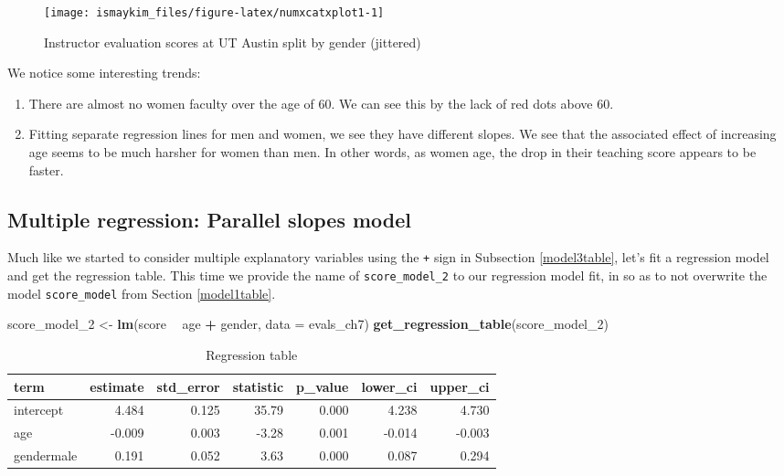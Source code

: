 \documentclass[12pt, krantz2,]{krantz}
\makeatletter
\newenvironment{Shaded}{\begin{snugshade}}{\end{snugshade}}
\newcommand{\DataTypeTok}[1]{\textcolor[rgb]{0.27,0.27,0.27}{#1}}
\newcommand{\DecValTok}[1]{\textcolor[rgb]{0.06,0.06,0.06}{#1}}
\newcommand{\KeywordTok}[1]{\textcolor[rgb]{0.27,0.27,0.27}{\textbf{#1}}}
\newcommand{\NormalTok}[1]{#1}
\newcommand{\OperatorTok}[1]{\textcolor[rgb]{0.43,0.43,0.43}{\textbf{#1}}}
\newcommand{\StringTok}[1]{\textcolor[rgb]{0.5,0.5,0.5}{#1}}
\providecommand{\tightlist}{%
  \setlength{\itemsep}{0pt}\setlength{\parskip}{0pt}}
\newenvironment{kframe}{%
\medskip{}
\setlength{\fboxsep}{.8em}
 \def\at@end@of@kframe{}%
 \ifinner\ifhmode%
  \def\at@end@of@kframe{\end{minipage}}%
  \begin{minipage}{\columnwidth}%
 \fi\fi%
 \def\FrameCommand##1{\hskip\@totalleftmargin \hskip-\fboxsep
 \colorbox{shadecolor}{##1}\hskip-\fboxsep
     \hskip-\linewidth \hskip-\@totalleftmargin \hskip\columnwidth}%
 \MakeFramed {\advance\hsize-\width
   \@totalleftmargin\z@ \linewidth\hsize
   \@setminipage}}%
 {\par\unskip\endMakeFramed%
 \at@end@of@kframe}
\renewenvironment{Shaded}{\begin{kframe}}{\end{kframe}}
\makeatother
\begin{document}
\begin{figure}

{\centering \texttt{[image: ismaykim\_files/figure-latex/numxcatxplot1-1]} 

}

\caption{Instructor evaluation scores at UT Austin split by gender (jittered)}\label{fig:numxcatxplot1}
\end{figure}

We notice some interesting trends:

\begin{enumerate}
\def\labelenumi{\arabic{enumi}.}
\tightlist
\item
  There are almost no women faculty over the age of 60. We can see this by the lack of red dots above 60.
\item
  Fitting separate regression lines for men and women, we see they have different slopes. We see that the associated effect of increasing age seems to be much harsher for women than men. In other words, as women age, the drop in their teaching score appears to be faster.
\end{enumerate}

\hypertarget{model4table}{%
\subsection{Multiple regression: Parallel slopes model}\label{model4table}}

Much like we started to consider multiple explanatory variables using the \texttt{+} sign in Subsection \ref{model3table}, let's fit a regression model and get the regression table. This time we provide the name of \texttt{score\_model\_2} to our regression model fit, in so as to not overwrite the model \texttt{score\_model} from Section \ref{model1table}.

\begin{Shaded}
\begin{Highlighting}[]
\NormalTok{score_model_}\DecValTok{2}\NormalTok{ <-}\StringTok{ }\KeywordTok{lm}\NormalTok{(score }\OperatorTok{~}\StringTok{ }\NormalTok{age }\OperatorTok{+}\StringTok{ }\NormalTok{gender, }\DataTypeTok{data =}\NormalTok{ evals_ch7)}
\KeywordTok{get_regression_table}\NormalTok{(score_model_}\DecValTok{2}\NormalTok{)}
\end{Highlighting}
\end{Shaded}

\begin{table}[H]

\caption{\label{tab:unnamed-chunk-220}Regression table}
\centering
\fontsize{10}{12}\selectfont
\begin{tabular}{lrrrrrr}
\toprule
term & estimate & std\_error & statistic & p\_value & lower\_ci & upper\_ci\\
\midrule
intercept & 4.484 & 0.125 & 35.79 & 0.000 & 4.238 & 4.730\\
age & -0.009 & 0.003 & -3.28 & 0.001 & -0.014 & -0.003\\
gendermale & 0.191 & 0.052 & 3.63 & 0.000 & 0.087 & 0.294\\
\bottomrule
\end{tabular}
\end{table}
\end{document}
